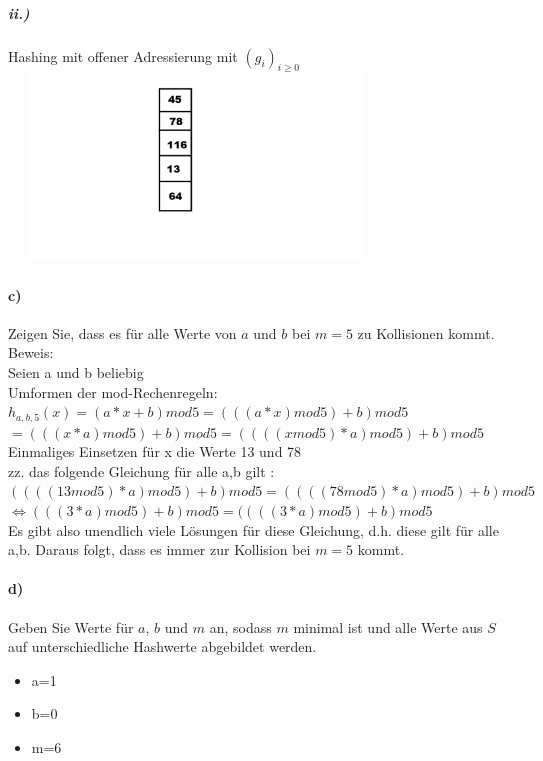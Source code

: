 \documentclass[paper=a4, fontsize=11pt]{scrartcl}
\numberwithin{equation}{section}
\numberwithin{figure}{section}
\numberwithin{table}{section}
\begin{document}
\subparagraph{ii.)}
Hashing mit offener Adressierung mit ${(g_i)}_{i\geq 0}$ \\

\includegraphics[width=10cm,height=5cm]{hashbii.png} \\

\paragraph{c)}
 Zeigen Sie, dass es für alle Werte von $a$ und $b$ bei $m=5$ zu Kollisionen kommt. \\
 
 Beweis: \\
 Seien a und b beliebig \\
 Umformen der mod-Rechenregeln: \\
 $h_{a,b,5}(x)=(a*x+b) mod 5 = (((a*x) mod 5) +b) mod 5$ \\
 $= (((x*a) mod 5)+b) mod 5 = ((((x mod 5)*a) mod 5) +b) mod 5$ \\
 Einmaliges Einsetzen für x die Werte 13 und 78 \\
 zz. das folgende Gleichung für alle a,b gilt : \\
 $((((13 mod 5)*a) mod 5)+b) mod 5 =((((78 mod 5)*a) mod 5)+b) mod 5$ \\
 $\Leftrightarrow (((3*a) mod 5)+b) mod 5 = ((((3*a) mod 5)+b) mod 5$ \\
 
 Es gibt also unendlich viele Lösungen für diese Gleichung, d.h. diese gilt für alle a,b. Daraus folgt, dass es immer zur Kollision bei $m=5$ kommt. \\
 
\paragraph{d)} 
Geben Sie Werte für $a$, $b$ und $m$ an, sodass $m$ minimal ist und alle Werte aus $S$ auf unterschiedliche Hashwerte abgebildet werden. \\
 \begin{itemize}
 \item a=1
 \item b=0
 \item m=6
 \end{itemize} \\
 
\end{document}
